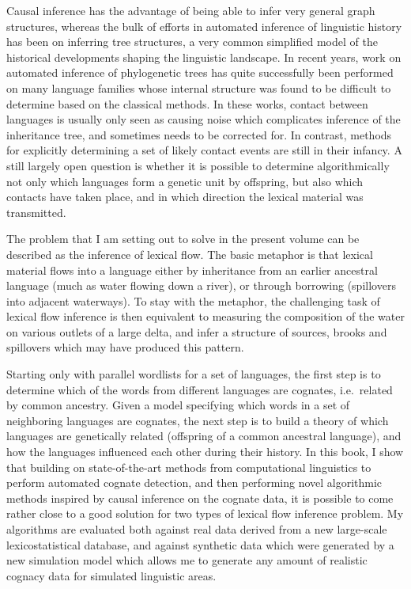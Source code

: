 Causal inference has the advantage of being able to infer very general graph structures, whereas the bulk of efforts in automated inference of linguistic history has been on inferring tree structures, a very common simplified model of the historical developments shaping the linguistic landscape. In recent years, work on automated inference of phylogenetic trees has quite successfully been performed on many language families whose internal structure was found to be difficult to determine based on the classical methods. In these works, contact between languages is usually only seen as causing noise which complicates inference of the inheritance tree, and sometimes needs to be corrected for. In contrast, methods for explicitly determining a set of likely contact events are still in their infancy. A still largely open question is whether it is possible to determine algorithmically not only which languages form a genetic unit by offspring, but also which contacts have taken place, and in which direction the lexical material was transmitted.

The problem that I am setting out to solve in the present volume can be described as the inference of lexical flow. The basic metaphor is that lexical material flows into a language either by inheritance from an earlier ancestral language (much as water flowing down a river), or through borrowing (spillovers into adjacent waterways). To stay with the metaphor, the challenging task of lexical flow inference is then equivalent to measuring the composition of the water on various outlets of a large delta, and infer a structure of sources, brooks and spillovers which may have produced this pattern.

Starting only with parallel wordlists for a set of languages, the first step is to determine which of the words from different languages are cognates, i.e.\ related by common ancestry. Given a model specifying which words in a set of neighboring languages are cognates, the next step is to build a theory of which languages are genetically related (offspring of a common ancestral language), and how the languages influenced each other during their history. In this book, I show that building on state-of-the-art methods from computational linguistics to perform automated cognate detection, and then performing novel algorithmic methods inspired by causal inference on the cognate data, it is possible to come rather close to a good solution for two types of lexical flow inference problem. My algorithms are evaluated both against real data derived from a new large-scale lexicostatistical database, and against synthetic data which were generated by a new simulation model which allows me to generate any amount of realistic cognacy data for simulated linguistic areas.

